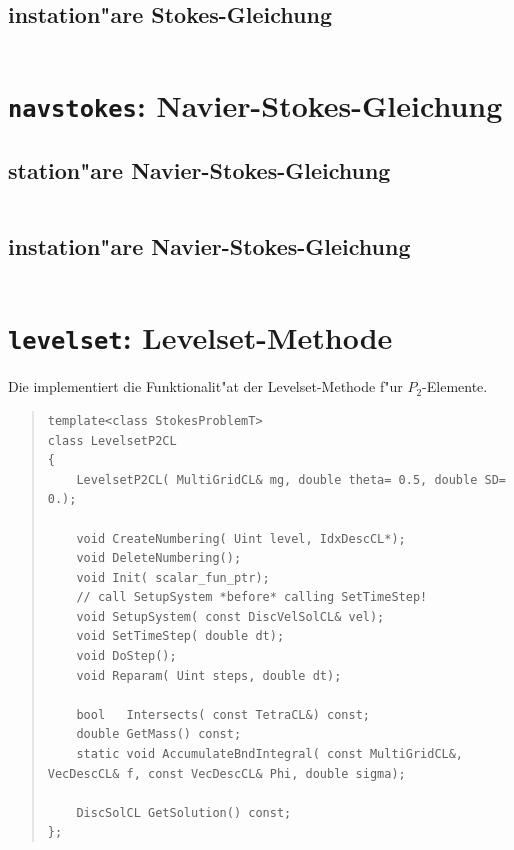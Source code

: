 \documentclass[11pt,a4paper]{article}
\newenvironment{Code}{\begin{quote}\scriptsize}{\end{quote}}
\begin{document}
\subsection{instation"are Stokes-Gleichung}
\begin{Code}
\begin{verbatim}
\end{verbatim}
\end{Code}
 
\section{{\tt navstokes}: Navier-Stokes-Gleichung}
 
\subsection{station"are Navier-Stokes-Gleichung}
\begin{Code}
\begin{verbatim}
\end{verbatim}
\end{Code}
\subsection{instation"are Navier-Stokes-Gleichung}
\begin{Code}
\begin{verbatim}
\end{verbatim}
\end{Code}
 
\section{{\tt levelset}: Levelset-Methode}

Die  implementiert die Funktionalit"at der Levelset-Methode
f"ur $P_2$-Elemente. 

\begin{Code}
\begin{verbatim}
template<class StokesProblemT>
class LevelsetP2CL
{
    LevelsetP2CL( MultiGridCL& mg, double theta= 0.5, double SD= 0.);
    
    void CreateNumbering( Uint level, IdxDescCL*);
    void DeleteNumbering();
    void Init( scalar_fun_ptr);
    // call SetupSystem *before* calling SetTimeStep!
    void SetupSystem( const DiscVelSolCL& vel);
    void SetTimeStep( double dt);
    void DoStep();
    void Reparam( Uint steps, double dt);
    
    bool   Intersects( const TetraCL&) const;
    double GetMass() const;
    static void AccumulateBndIntegral( const MultiGridCL&, VecDescCL& f, const VecDescCL& Phi, double sigma);
    
    DiscSolCL GetSolution() const;
};
\end{verbatim}
\end{Code}
\end{document}
